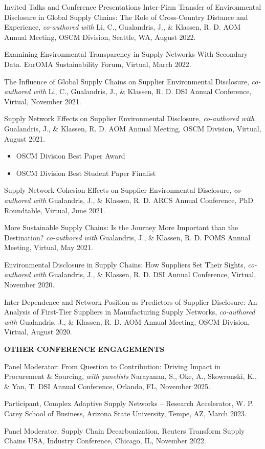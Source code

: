 \documentclass{resume} %
\begin{document}
\begin{rSection}{Invited Talks and Conference Presentations}
Inter-Firm Transfer of Environmental Disclosure in Global Supply Chains: The Role of Cross-Country Distance and Experience, {\em co-authored with} Li, C., Gualandris, J., \& Klassen, R. D. AOM Annual Meeting, OSCM Division, Seattle, WA, August 2022.

Examining Environmental Transparency in Supply Networks With Secondary Data. EurOMA Sustainability Forum, Virtual, March 2022.

The Influence of Global Supply Chains on Supplier Environmental Disclosure, {\em co-authored with} Li, C., Gualandris, J., \& Klassen, R. D. DSI Annual Conference, Virtual, November 2021.

\begin{samepage}
Supply Network Effects on Supplier Environmental Disclosure, {\em co-authored with} Gualandris, J., \& Klassen, R. D. AOM Annual Meeting, OSCM Division, Virtual, August 2021.
\begin{itemize}
    \item OSCM Division Best Paper Award
    \item OSCM Division Best Student Paper Finalist \medskip
\end{itemize}
\end{samepage}
Supply Network Cohesion Effects on Supplier Environmental Disclosure, {\em co-authored with} Gualandris, J., \& Klassen, R. D. ARCS Annual Conference, PhD Roundtable, Virtual, June 2021.

More Sustainable Supply Chains: Is the Journey More Important than the Destination? {\em co-authored with} Gualandris, J., \& Klassen, R. D. POMS Annual Meeting, Virtual, May 2021.

Environmental Disclosure in Supply Chains: How Suppliers Set Their Sights, {\em co-authored with} Gualandris, J., \& Klassen, R. D. DSI Annual Conference, Virtual, November 2020.

Inter-Dependence and Network Position as Predictors of Supplier Disclosure: An Analysis of First-Tier Suppliers in Manufacturing Supply Networks, {\em co-authored with} Gualandris, J., \& Klassen, R. D. AOM Annual Meeting, OSCM Division, Virtual, August 2020.

\MakeUppercase{\bf{Other Conference Engagements}}

Panel Moderator: From Question to Contribution: Driving Impact in Procurement \& Sourcing, \textit{with panelists} Narayanan, S., Oke, A., Skowronski, K., \& Yan, T. DSI Annual Conference, Orlando, FL, November 2025.

Participant, Complex Adaptive Supply Networks -- Research Accelerator, W. P. Carey School of Business, Arizona State University, Tempe, AZ, March 2023.

Panel Moderator, Supply Chain Decarbonization, Reuters Transform Supply Chains USA, Industry Conference, Chicago, IL, November 2022.

\end{rSection}
\end{document}
